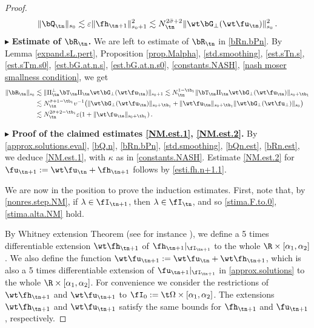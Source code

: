 \documentclass[a4paper,reqno,10pt]{article}
\begin{document}
\begin{proof}
\begin{align}
    \| \bQ_{\tn} \|_{s_0} \lesssim \varepsilon \| \fh_{\tn+1} \|_{s_0+1}^{2} \lesssim N_{\tn}^{2\bar\sigma+2} \|  \wt\bG_{\perp}(\wt\fu_{\tn})\|_{s_0}^2 \,. \label{bQn.est}
\end{align}
\noindent $\blacktriangleright$ {\bf Estimate of $\bR_{\tn}$.} We are left to estimate of $\bR_{\tn}$ in  \eqref{bRn.bPn}. By Lemma \ref{expand.sL.pert}, Proposition \ref{prop.Malpha}, \eqref{std.smoothing}, \eqref{est.sTn.s}, \eqref{est.sTm.s0}, \eqref{est.bG.at.n.s}, \eqref{est.bG.at.n.s0}, \eqref{constants.NASH}, \eqref{nash moser smallness condition}, we get
\begin{align}
    \| \bR_{\tn} \|_{s_0} & \lesssim \|  \Pi_{\tn}^\perp \bT_{\tn}  \Pi_{\tn} \wt\bG_{\perp}(\wt\fu_{\tn}) \|_{s_0+1} \lesssim N_{\tn}^{1-\tb_{1}} \|   \bT_{\tn}  \Pi_{\tn} \wt\bG_{\perp}(\wt\fu_{\tn}) \|_{s_0+\tb_{1}} \\
    & \lesssim N_{\tn}^{\bar\sigma+1-\tb_{1}}\upsilon^{-1} \big( \| \wt\bG_{\perp}(\wt\fu_{\tn}) \|_{s_0+\tb_{1}} + \| \wt\fu_{\tn} \|_{s_0+\tb_{1}} \| \wt\bG_{\perp}(\wt\fu_{\perp}) \|_{s_0}  \big) \\
    & \lesssim N_{\tn}^{2\bar\sigma+2-\tb_{1}}\varepsilon (1+ \| \wt\fu_{\tn} \|_{s_0+\tb_{1}}) \,. \label{bRn.est}
\end{align}

\noindent $\blacktriangleright$ {\bf Proof of the claimed estimates \eqref{NM.est.1}, \eqref{NM.est.2}.} By \eqref{approx.solutions.eval}, \eqref{bQ.n}, \eqref{bRn.bPn}, \eqref{std.smoothing}, \eqref{bQn.est}, 
\eqref{bRn.est}, we deduce \eqref{NM.est.1}, with $\kappa$ as in \eqref{constants.NASH}. Estimate \eqref{NM.est.2} for $\fu_{\tn+1}:=\wt\fu_{\tn}+\fh_{\tn+1}$ follows by \eqref{esti.fh.n+1.1}.

\medskip

We are now in the position to prove the induction estimates. First, note that, by \eqref{nonres.step.NM}, if $\lambda \in \fI_{\tn+1}$, then $\lambda\in \fI_{\tn}$, and so \eqref{stima.F.to.0}, \eqref{stima.alta.NM} hold. 

By Whitney extension Theorem (see for instance \cite[Th.m B.2]{FMT25}), we define a 5 times differentiable extension  $\wt\fh_{\tn+1}$ of $\fh_{\tn+1}|_{\fI_{\tn+1}}$ to the whole $\R\times [\alpha_{1},\alpha_{2}]$. We also define the function $\wt\fu_{\tn+1} := \wt\fu_{\tn}+ \wt\fh_{\tn+1}$, which is also a  5 times differentiable extension of $\fu_{\tn+1}|_{\fI_{\tn+1}}$ in \eqref{approx.solutions} to the whole $\R\times [\alpha_{1},\alpha_{2}]$. For convenience we consider the restrictions of $\wt\fh_{\tn+1}$ and $\wt\fu_{\tn+1}$ to $\fI_{0}:= \t\Omega\times [\alpha_{1},\alpha_{2}]$. The extensions $\wt\fh_{\tn+1}$ and $\wt\fu_{\tn+1}$ satisfy the same bounds for $\fh_{\tn+1}$ and $\fu_{\tn+1}$, respectively.


\end{proof}
\end{document}
